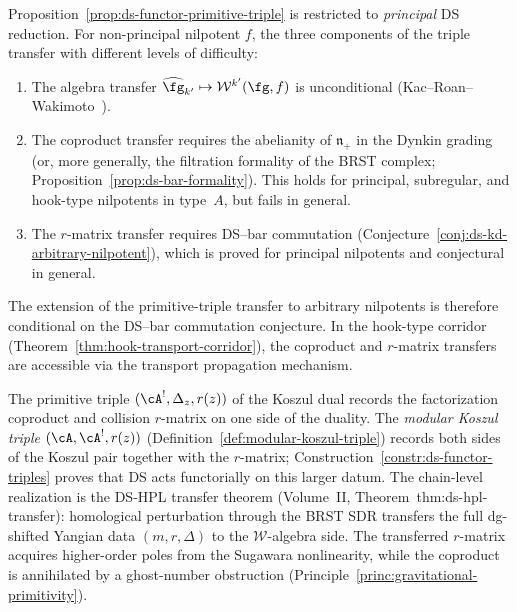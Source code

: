 \begin{remark}
\label{rem:ds-triple-scope}
Proposition~\ref{prop:ds-functor-primitive-triple} is restricted
to \emph{principal} DS reduction. For non-principal nilpotent
$f$, the three components of the triple transfer with different
levels of difficulty:
\begin{enumerate}[label=\textup{(\alph*)}]
\item The algebra transfer
 $\widehat{\fg}_{k'} \mapsto \mathcal{W}^{k'}(\fg, f)$
 is unconditional
 \textup{(}Kac--Roan--Wakimoto~\cite{KRW}\textup{)}.
\item The coproduct transfer requires the abelianity of
 $\mathfrak{n}_+$ in the Dynkin grading (or, more generally,
 the filtration formality of the BRST complex;
 Proposition~\ref{prop:ds-bar-formality}). This holds for
 principal, subregular, and hook-type nilpotents in type~$A$,
 but fails in general.
\item The $r$-matrix transfer requires DS--bar commutation
 \textup{(}Conjecture~\ref{conj:ds-kd-arbitrary-nilpotent}\textup{)},
 which is proved for principal nilpotents and conjectural in
 general.
\end{enumerate}
The extension of the primitive-triple transfer to arbitrary
nilpotents is therefore conditional on the DS--bar commutation
conjecture. In the hook-type corridor
\textup{(}Theorem~\ref{thm:hook-transport-corridor}\textup{)},
the coproduct and $r$-matrix transfers are accessible via
the transport propagation mechanism.

The primitive triple $(\cA^!, \Delta_z, r(z))$ of the
Koszul dual records the factorization coproduct and
collision $r$-matrix on one side of the duality. The
\emph{modular Koszul triple}
$(\cA, \cA^!, r(z))$
\textup{(}Definition~\textup{\ref{def:modular-koszul-triple}}\textup{)}
records both sides of the Koszul pair together with the
$r$-matrix; Construction~\textup{\ref{constr:ds-functor-triples}}
proves that DS acts functorially on this larger datum.
The chain-level realization is the DS-HPL transfer theorem
(Volume~II, Theorem~thm:ds-hpl-transfer): homological
perturbation through the BRST SDR transfers the full
dg-shifted Yangian data $(m, r, \Delta)$ to the
$\mathcal{W}$-algebra side. The transferred $r$-matrix
acquires higher-order poles from the Sugawara nonlinearity,
while the coproduct is annihilated by a ghost-number
obstruction (Principle~\ref{princ:gravitational-primitivity}).
\end{remark}

